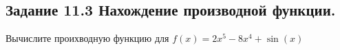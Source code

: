 \subsection*{\textbf{Задание 11.3} Нахождение производной функции.}
Вычислите проихводную функцию для $f(x) = 2x^5-8x^4+\sin(x)$

\begin{figure}[H]
    \renewcommand{\figurename}{Рисунок}
    \label{fig:image_3}
\end{figure}